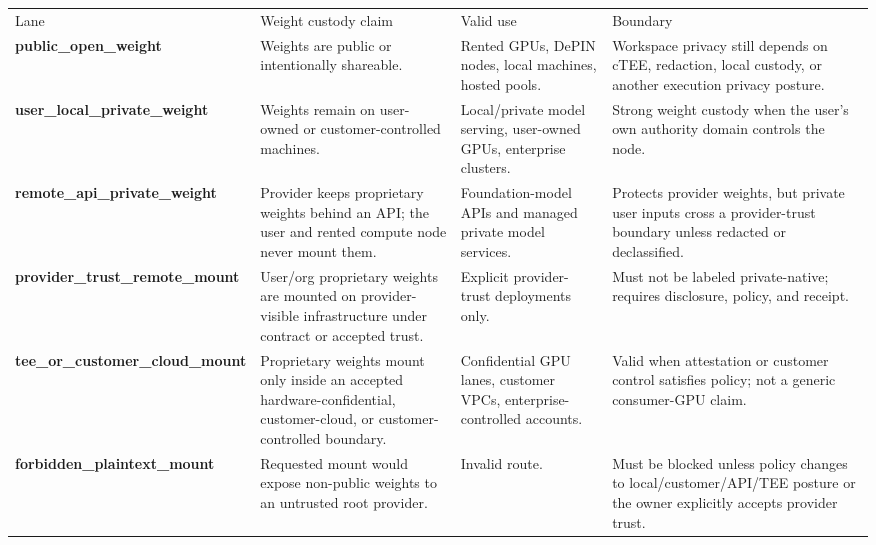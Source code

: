 \documentclass[
  11pt,
]{article}
\begin{document}
\begin{longtable}[]{@{}
  >{\raggedright\arraybackslash}p{}
  >{\raggedright\arraybackslash}p{}
  >{\raggedright\arraybackslash}p{}
  >{\raggedright\arraybackslash}p{}@{}}
\toprule\noalign{}
& & & \\
\midrule\noalign{}
\endhead
\bottomrule\noalign{}
\endlastfoot
Lane & Weight custody claim & Valid use & Boundary \\
\textbf{public\_\allowbreak{}open\_\allowbreak{}weight} & Weights are public or intentionally
shareable. & Rented GPUs, DePIN nodes, local machines, hosted pools. &
Workspace privacy still depends on cTEE, redaction, local custody, or
another execution privacy posture. \\
\textbf{user\_\allowbreak{}local\_\allowbreak{}private\_\allowbreak{}weight} & Weights remain on
user-owned or customer-controlled machines. & Local/private model
serving, user-owned GPUs, enterprise clusters. & Strong weight custody
when the user's own authority domain controls the node. \\
\textbf{remote\_\allowbreak{}api\_\allowbreak{}private\_\allowbreak{}weight} & Provider keeps proprietary
weights behind an API; the user and rented compute node never mount
them. & Foundation-model APIs and managed private model services. &
Protects provider weights, but private user inputs cross a
provider-trust boundary unless redacted or declassified. \\
\textbf{provider\_\allowbreak{}trust\_\allowbreak{}remote\_\allowbreak{}mount} & User/org proprietary weights
are mounted on provider-visible infrastructure under contract or
accepted trust. & Explicit provider-trust deployments only. & Must not
be labeled private-native; requires disclosure, policy, and receipt. \\
\textbf{tee\_\allowbreak{}or\_\allowbreak{}customer\_\allowbreak{}cloud\_\allowbreak{}mount} & Proprietary weights mount
only inside an accepted hardware-confidential, customer-cloud, or
customer-controlled boundary. & Confidential GPU lanes, customer VPCs,
enterprise-controlled accounts. & Valid when attestation or customer
control satisfies policy; not a generic consumer-GPU claim. \\
\textbf{forbidden\_\allowbreak{}plaintext\_\allowbreak{}mount} & Requested mount would expose
non-public weights to an untrusted root provider. & Invalid route. &
Must be blocked unless policy changes to local/customer/API/TEE posture
or the owner explicitly accepts provider trust. \\
\end{longtable}
\end{document}
